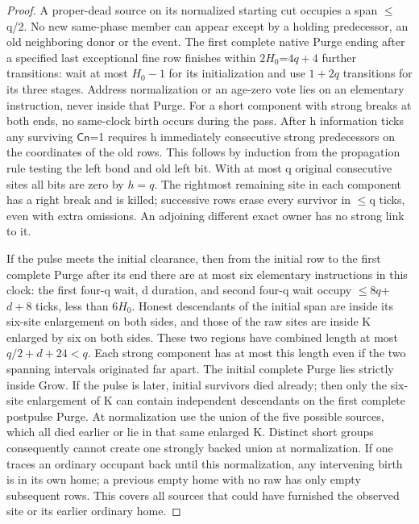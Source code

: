 \begin{proof}
A proper-dead source on its normalized starting cut occupies a span \(\le\)q/2. No new same-phase member can appear except by a holding predecessor, an old neighboring donor or the event. The first complete native Purge ending after a specified last exceptional fine row finishes within \(2H_0\)=\(4q+4\) further transitions: wait at most \(H_0- 1\) for its initialization and use \(1+2q\) transitions for its three stages. Address normalization or an age-zero vote lies on an elementary instruction, never inside that Purge. For a short component with strong breaks at both ends, no same-clock birth occurs during the pass. After h information ticks any surviving \(\mathsf{Cn}\)=1 requires h immediately consecutive strong predecessors on the coordinates of the old rows. This follows by induction from the propagation rule testing the left bond and old left bit. With at most q original consecutive sites all bits are zero by \(h=q\). The rightmost remaining site in each component has a right break and is killed; successive rows erase every survivor in \(\le\)q ticks, even with extra omissions. An adjoining different exact owner has no strong link to it.

If the pulse meets the initial clearance, then from the initial row to the first complete Purge after its end there are at most six elementary instructions in this clock: the first four-q wait, d duration, and second four-q wait occupy \(\le\)\(8q\)+\(d+8\) ticks, less than \(6H_0\). Honest descendants of the initial span are inside its six-site enlargement on both sides, and those of the raw sites are inside K enlarged by six on both sides. These two regions have combined length at most \(q/2+d+24<q\). Each strong component has at most this length even if the two spanning intervals originated far apart. The initial complete Purge lies strictly inside Grow. If the pulse is later, initial survivors died already; then only the six-site enlargement of K can contain independent descendants on the first complete postpulse Purge. At normalization use the union of the five possible sources, which all died earlier or lie in that same enlarged K. Distinct short groups consequently cannot create one strongly backed union at normalization. If one traces an ordinary occupant back until this normalization, any intervening birth is in its own home; a previous empty home with no raw has only empty subsequent rows. This covers all sources that could have furnished the observed site or its earlier ordinary home.


\end{proof}
